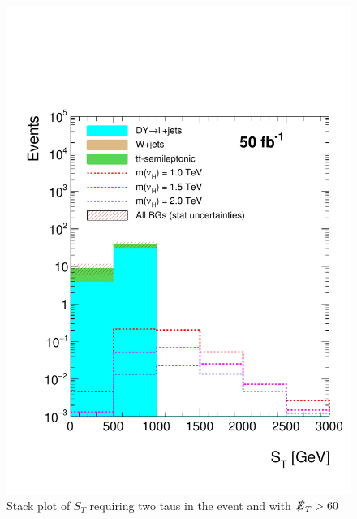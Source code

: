 \begin{figure}
\centering
\includegraphics[width=\linewidth]{StackPlots/ST_2taus_met60_50ifb.pdf}
\caption{Stack plot of $S_{T}$ requiring two taus in the event and with $\slashed{E}_{T} > 60$}
\label{fig: HT2tausMet60}
\end{figure}








